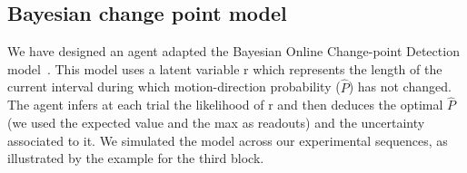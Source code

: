 \documentclass[profile,final,english, draft]{article}%
\newcommand{\citep}[1]{(\cite{#1})}
\begin{document}
%



\subsection{Bayesian change point model}

We have designed an agent adapted the Bayesian Online Change-point Detection model~\parencite{AdamsMackay2007}. This model uses a latent variable r which represents the length of the current interval during which motion-direction probability ($\hat{P}$) has not changed. The agent infers at each trial the likelihood  of r and then deduces the optimal $\hat{P}$ (we used the expected value and the max as readouts) and the uncertainty associated to it. We simulated the model across our experimental sequences, as illustrated by the example for the third block.


%
%
%
%
\end{document}
